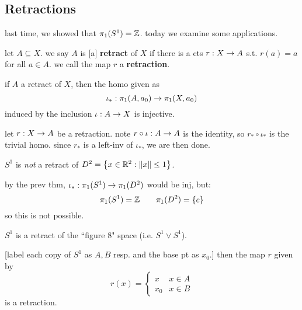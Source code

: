 \subsection{Retractions}

last time, we showed that $\pi_{1}(S^{1})=\mathbb{Z}$.
today we examine some applications.

\begin{defn}
    let $A\subseteq X$.
    we say $A$ is [a] \textbf{retract} of $X$ if there is a cts $r:X\rightarrow A$ s.t. $r(a)=a$ for
    all $a\in A$.
    we call the map $r$ a \textbf{retraction}.
\end{defn}

\begin{prop}
    if $A$ a retract of $X$, then the homo given as
    \begin{equation*}
        \iota_{*}:\pi_{1}(A,a_{0})\rightarrow\pi_{1}(X,a_{0})
    \end{equation*}
    induced by the inclusion $\iota:A\rightarrow X$ is injective.
\end{prop}

\begin{pf}[source=Primary Source Material]
    let $r:X\rightarrow A$ be a retraction.
    note $r\circ\iota:A\rightarrow A$ is the identity, so $r_{*}\circ\iota_{*}$ is the trivial homo.
    since $r_{*}$ is a left-inv of $\iota_{*}$, we are then done.
\end{pf}

\begin{xmp}[source=Primary Source Material]
    $S^{1}$ is \textit{not} a retract of $D^{2}=\left\{{x\in\mathbb{R}^{2}:\norm{x}\leq1}\right\}$.
\end{xmp}
by the prev thm, $\iota_{*}:\pi_{1}(S^{1})\rightarrow\pi_{1}(D^{2})$ would be inj, but:
\begin{equation*}
    \pi_{1}(S^{1}) = \mathbb{Z} \qquad \pi_{1}(D^{2}) = \left\{{e}\right\}
\end{equation*}
so this is not possible.

\begin{xmp}[source=Primary Source Material]
    $S^{1}$ is a retract of the ``figure 8" space (i.e. $S^{1}\vee S^{1}$).
\end{xmp}
[label each copy of $S^{1}$ as $A,B$ resp. and the base pt as $x_{0}$.]
then the map $r$ given by
\begin{equation*}
    r(x)=
    \begin{cases}
        x & x\in A \\ x_{0} & x \in B
    \end{cases}
\end{equation*}
is a retraction.

